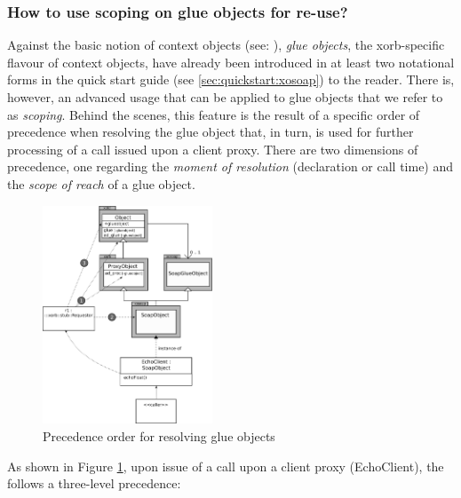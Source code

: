   \subsubsection{How to use scoping on glue objects for re-use?}\label{sec:advanced:xorb:gobjects:why}
  Against the basic notion of context objects (see: ), \emph{glue objects}, the xorb-specific flavour of context objects, have already been introduced in at least two notational forms in the quick start guide (see \ref{sec:quickstart:xosoap}) to the reader. There is, however, an advanced usage that can be applied to glue objects that we refer to as \emph{scoping}. Behind the scenes, this feature is the result of a specific order of precedence when resolving the glue object that, in turn, is used for further processing of a call issued upon a client proxy. There are two dimensions of precedence, one regarding the \emph{moment of resolution} (declaration or call time) and the \emph{scope of reach} of a glue object.
  \begin{figure}[htbp]
\begin{center}
\includegraphics[width=0.45\textwidth]{img/scoping-glue-objects-structure.png}
\caption{Precedence order for resolving glue objects}
\label{fig:advanced:scoping:1}
\end{center}
\end{figure}
As shown in Figure \ref{fig:advanced:scoping:1}, upon issue of a call upon a client proxy (EchoClient), the  follows a three-level precedence:
